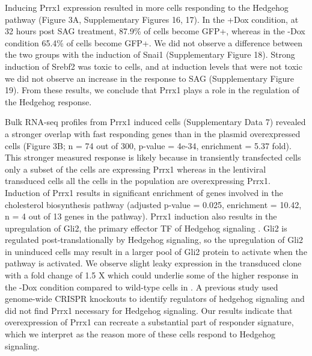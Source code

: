 Inducing Prrx1 expression resulted in more cells responding to the Hedgehog pathway (Figure 3A, Supplementary Figures 16, 17). In the +Dox condition, at 32 hours post SAG treatment, 87.9\% of cells become GFP+, whereas in the -Dox condition 65.4\% of cells become GFP+. We did not observe a difference between the two groups with the induction of Snai1 (Supplementary Figure 18). Strong induction of Srebf2 was toxic to cells, and at induction levels that were not toxic we did not observe an increase in the response to SAG  (Supplementary Figure 19). From these results, we conclude that Prrx1 plays a role in the regulation of the Hedgehog response.

Bulk RNA-seq profiles from Prrx1 induced cells (Supplementary Data 7) revealed a stronger overlap with fast responding genes than in the plasmid overexpressed cells (Figure 3B; n = 74 out of 300, p-value = 4e-34, enrichment = 5.37 fold). This stronger measured response is likely because in transiently transfected cells only a subset of the cells are expressing Prrx1 whereas in the lentiviral transduced cells all the cells in the population are overexpressing Prrx1. Induction of Prrx1 results in significant enrichment of genes involved in the cholesterol biosynthesis pathway (adjusted p-value = 0.025, enrichment = 10.42, n = 4 out of 13 genes in the pathway). Prrx1 induction also results in the upregulation of Gli2, the primary effector TF of Hedgehog signaling \cite{Kong2019-wo,Briscoe2013-ze,Lee2016-bf}. Gli2 is regulated post-translationally by Hedgehog signaling, so the upregulation of Gli2 in uninduced cells may result in a larger pool of Gli2 protein to activate when the pathway is activated. We observe slight leaky expression in the transduced clone with a fold change of 1.5 X which could underlie some of the higher response in the -Dox condition compared to wild-type cells in . A previous study used genome-wide CRISPR knockouts \cite{Pusapati2018-gs} to identify regulators of hedgehog signaling and did not find Prrx1 necessary for Hedgehog signaling. Our results indicate that overexpression of Prrx1 can recreate a substantial part of responder signature, which we interpret as the reason more of these cells respond to Hedgehog signaling.

